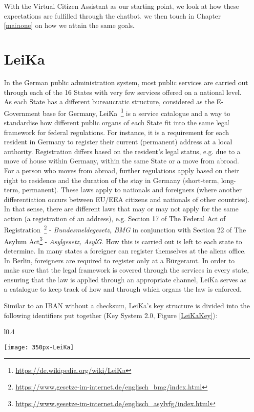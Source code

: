 With the Virtual Citizen Assistant as our starting point, we look at how these expectations are fulfilled through the chatbot. 
we then touch in Chapter \ref{mainone} on how we attain the same goals.



\section{LeiKa}
\label{leikaSec}

In the German public administration system, most public services are carried out through each of the 16 States with very few services offered on a national level. As each State has a different bureaucratic structure, considered as the E-Government base for Germany, LeiKa~\footnote{\url{https://de.wikipedia.org/wiki/LeiKa}} is a service catalogue and a way to standardise how different public organs of each State fit into the same legal framework for federal regulations. For instance, it is a requirement for each resident in Germany to register their current (permanent) address at a local authority. Registration differs based on the resident's legal status, e.g. due to a move of house within Germany, within the same State or a move from abroad. For a person who moves from abroad, further regulations apply based on their right to residence and the duration of the stay in Germany (short-term, long-term, permanent). These laws apply to nationals and foreigners (where another differentiation occurs between EU/EEA citizens and nationals of other countries). In that sense, there are different laws that may or may not apply for the same action (a registration of an address), e.g. Section 17 of The Federal Act of Registration~\footnote{\url{https://www.gesetze-im-internet.de/englisch_bmg/index.html}} - \textit{Bundesmeldegesetz, BMG} in conjunction with Section 22 of The Asylum Act\footnote{\url{https://www.gesetze-im-internet.de/englisch_asylvfg/index.html}} - \textit{Asylgesetz, AsylG}. How this is carried out is left to each state to determine. In many states a foreigner can register themselves at the aliens office. In Berlin, foreigners are required to register only at a Bürgeramt. In order to make sure that the legal framework is covered through the services in every state, ensuring that the law is applied through an appropriate channel, LeiKa serves as a catalogue to keep track of how and through which organs the law is enforced.




Similar to an IBAN without a checksum, LeiKa's key structure is divided into the following identifiers put together (Key System 2.0, Figure \ref{LeiKaKey}):
\begin{wrapfigure}{l}{0.4\textwidth}
	\caption[Leika Key System]{Leika Key System 2.0, based on~\footnotemark, \footnotesize \copyright \href{https://de.wikipedia.org/wiki/Leika}{CC, Wikipedia}}
	\label{LeiKaKey}
	\texttt{[image: 350px-LeiKa]}
\end{wrapfigure}

